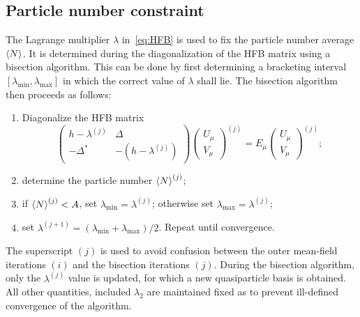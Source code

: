 \documentclass[%
 reprint, linenumbers,
 amsmath,amssymb,
 aps, physrev
]{revtex4-2}
\begin{document}
\subsection{Particle number constraint}
The Lagrange multiplier $\lambda$ in~\eqref{eq:HFB} is used to fix the particle number average $\expval{N}$. It is determined during the diagonalization of the HFB matrix using a bisection algorithm.
This can be done by first determining a bracketing interval $[\lambda_\text{min}, \lambda_\text{max}]$ in which the correct value of $\lambda$ shall lie. The bisection algorithm then proceeds as follows:
\begin{enumerate}
\item Diagonalize the HFB matrix 
\begin{equation}
\begin{pmatrix}
  h - \lambda^{(j)} & \Delta \\ -\Delta^* & -(h-\lambda^{(j)})
\end{pmatrix}
\begin{pmatrix}
  U_\mu \\ V_\mu
\end{pmatrix}^{(j)}
=E_\mu \begin{pmatrix}
  U_\mu \\ V_\mu
\end{pmatrix}^{(j)};
\end{equation}
\item determine the particle number $\expval{N}^{(j)}$;
\item if $\expval{N}^{(j)} < A$, set $\lambda_\text{min} = \lambda^{(j)}$; otherwise set $\lambda_\text{max} = \lambda^{(j)}$;
\item set $\lambda^{(j+1)} = (\lambda_\text{min} + \lambda_\text{max})/2$. Repeat until convergence.
\end{enumerate}

The superscript $(j)$ is used to avoid confusion between the outer mean-field iterations $(i)$ and the bisection iterations $(j)$. During the bisection algorithm, only the $\lambda^{(j)}$ value is updated, for which a new quasiparticle basis is obtained. All other quantities, included $\lambda_2$ are maintained fixed as to prevent ill-defined convergence of the algorithm.
\end{document}
